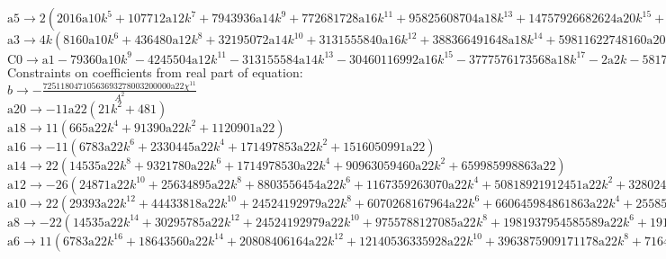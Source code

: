 \documentclass[12pt,a4paper,draft]{article}
\begin{document}
$\text{a5}\to 2 \left(2016 \text{a10} k^5+107712 \text{a12} k^7+7943936 \text{a14} k^9+772681728 \text{a16} k^{11}+95825608704 \text{a18} k^{13}+14757926682624 \text{a20} k^{15}+2763296970964992 \text{a22} k^{17}+3 \text{a6} k+56 \text{a8} k^3\right)$\\
$\text{a3}\to 4 k \left(8160 \text{a10} k^6+436480 \text{a12} k^8+32195072 \text{a14} k^{10}+3131555840 \text{a16} k^{12}+388366491648 \text{a18} k^{14}+59811622748160 \text{a20} k^{16}+11199220768440320 \text{a22} k^{18}+\text{a4}+10 \text{a6} k^2+224 \text{a8} k^4\right)$\\
$\text{C0}\to \text{a1}-79360 \text{a10} k^9-4245504 \text{a12} k^{11}-313155584 \text{a14} k^{13}-30460116992 \text{a16} k^{15}-3777576173568 \text{a18} k^{17}-2 \text{a2} k-581777702256640 \text{a20} k^{19}-108932957168730112 \text{a22} k^{21}-8 \text{a4} k^3-96 \text{a6} k^5-2176 \text{a8} k^7$\\
Constraints on coefficients from real part of equation:
\\$b\to -\frac{72511804710563693278003200000 \text{a22} \chi ^{11}}{A^2}$\\
$\text{a20}\to -11 \text{a22} \left(21 k^2+481\right)$\\
$\text{a18}\to 11 \left(665 \text{a22} k^4+91390 \text{a22} k^2+1120901 \text{a22}\right)$\\
$\text{a16}\to -11 \left(6783 \text{a22} k^6+2330445 \text{a22} k^4+171497853 \text{a22} k^2+1516050991 \text{a22}\right)$\\
$\text{a14}\to 22 \left(14535 \text{a22} k^8+9321780 \text{a22} k^6+1714978530 \text{a22} k^4+90963059460 \text{a22} k^2+659985998863 \text{a22}\right)$\\
$\text{a12}\to -26 \left(24871 \text{a22} k^{10}+25634895 \text{a22} k^8+8803556454 \text{a22} k^6+1167359263070 \text{a22} k^4+50818921912451 \text{a22} k^2+328024821386851 \text{a22}\right)$\\
$\text{a10}\to 22 \left(29393 \text{a22} k^{12}+44433818 \text{a22} k^{10}+24524192979 \text{a22} k^8+6070268167964 \text{a22} k^6+660645984861863 \text{a22} k^4+25585936068174378 \text{a22} k^2+156444211445832853 \text{a22}\right)$\\
$\text{a8}\to -22 \left(14535 \text{a22} k^{14}+30295785 \text{a22} k^{12}+24524192979 \text{a22} k^{10}+9755788127085 \text{a22} k^8+1981937954585589 \text{a22} k^6+191894520511307835 \text{a22} k^4+7039989515062478385 \text{a22} k^2+43284486179476383023 \text{a22}\right)$\\
$\text{a6}\to 11 \left(6783 \text{a22} k^{16}+18643560 \text{a22} k^{14}+20808406164 \text{a22} k^{12}+12140536335928 \text{a22} k^{10}+3963875909171178 \text{a22} k^8+716406209908882584 \text{a22} k^6+65706568807249798260 \text{a22} k^4+2423931226050677449288 \text{a22} k^2+16057731258918960782351 \text{a22}\right)$\\
\end{document}
